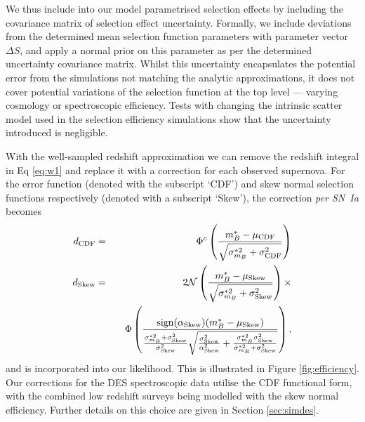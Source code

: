 \documentclass[a4paper,fleqn,usenatbib,manuscript]{emulateapj}
\begin{document}
We thus include into our model parametrised selection effects by including the covariance matrix of selection effect uncertainty. Formally, we include deviations from the determined mean selection function parameters with parameter vector $\Delta S$, and apply a normal prior on this parameter as per the determined uncertainty covariance matrix.  Whilst this uncertainty encapsulates the potential error from the simulations not matching the analytic approximations, it does not cover potential variations of the selection function at the top level --- varying cosmology or spectroscopic efficiency. Tests with changing the intrinsic scatter model used in the selection efficiency simulations show that the uncertainty introduced is negligible.


With the well-sampled redshift approximation we can remove the redshift integral in Eq \eqref{eq:w1} and replace it with a correction for each observed supernova. For the error function (denoted with the subscript `CDF') and skew normal selection functions respectively (denoted with a subscript `Skew'), the correction \textit{per SN~Ia} becomes
\begin{eqnarray}
d_{\rm CDF} &=& \Phi^c\left(  \frac{m^*_B - \mu_{\rm CDF}}{\sqrt{\sigma^{*2}_{m_B} + \sigma_{\rm CDF}^2}}  \right) \label{eq:seldes}\\
d_{\rm Skew} &=& 2\mathcal{N}\left( \frac{m_B^* - \mu_{\rm Skew}}{\sqrt{\sigma^{*2}_{m_B} + \sigma_{\rm Skew}^2}}\right) \times \notag\\
&\quad\quad& \Phi\left(  \frac{{\rm sign}(\alpha_{\rm Skew})(m_B^* - \mu_{\rm Skew})}{\frac{\sigma_{m_B}^{*2} + \sigma^2_{\rm Skew}}{\sigma^2_{\rm Skew}} \sqrt{\frac{\sigma^2_{\rm Skew}}{\alpha^2_{\rm Skew}} + \frac{\sigma_{m_B}^{*2} \sigma^2_{\rm Skew}}{\sigma_{m_B}^{*2} + \sigma^2_{\rm Skew}}} }\right), \label{eq:sellow-$z$}
\end{eqnarray}
and is incorporated into our likelihood. This is illustrated in Figure \ref{fig:efficiency}. Our corrections for the DES spectroscopic data utilise the CDF functional form, with the combined low redshift surveys being modelled with the skew normal efficiency. Further details on this choice are given in Section \ref{sec:simdes}.
\end{document}
